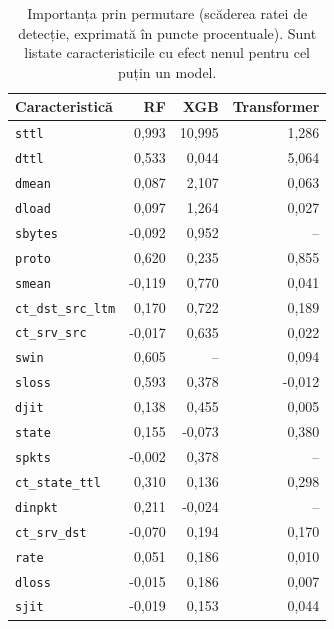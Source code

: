\begin{table}[!ht]
    \caption{Importanța prin permutare (scăderea ratei de detecție, exprimată în puncte procentuale). Sunt listate caracteristicile cu efect nenul pentru cel puțin un model.}
    \centering\footnotesize
    \begin{tabular}{|l|r|r|r|}
        \hline
        \textbf{Caracteristică} & \textbf{RF} & \textbf{XGB} & \textbf{Transformer} \\
        \hline
        \texttt{sttl} & 0,993 & 10,995 & 1,286 \\
        \hline
        \texttt{dttl} & 0,533 & 0,044 & 5,064 \\
        \hline
        \texttt{dmean} & 0,087 & 2,107 & 0,063 \\
        \hline
        \texttt{dload} & 0,097 & 1,264 & 0,027 \\
        \hline
        \texttt{sbytes} & -0,092 & 0,952 & -- \\
        \hline
        \texttt{proto} & 0,620 & 0,235 & 0,855 \\
        \hline
        \texttt{smean} & -0,119 & 0,770 & 0,041 \\
        \hline
        \texttt{ct\_dst\_src\_ltm} & 0,170 & 0,722 & 0,189 \\
        \hline
        \texttt{ct\_srv\_src} & -0,017 & 0,635 & 0,022 \\
        \hline
        \texttt{swin} & 0,605 & -- & 0,094 \\
        \hline
        \texttt{sloss} & 0,593 & 0,378 & -0,012 \\
        \hline
        \texttt{djit} & 0,138 & 0,455 & 0,005 \\
        \hline
        \texttt{state} & 0,155 & -0,073 & 0,380 \\
        \hline
        \texttt{spkts} & -0,002 & 0,378 & -- \\
        \hline
        \texttt{ct\_state\_ttl} & 0,310 & 0,136 & 0,298 \\
        \hline
        \texttt{dinpkt} & 0,211 & -0,024 & -- \\
        \hline
        \texttt{ct\_srv\_dst} & -0,070 & 0,194 & 0,170 \\
        \hline
        \texttt{rate} & 0,051 & 0,186 & 0,010 \\
        \hline
        \texttt{dloss} & -0,015 & 0,186 & 0,007 \\
        \hline
        \texttt{sjit} & -0,019 & 0,153 & 0,044 \\

\end{tabular}
\end{table}
